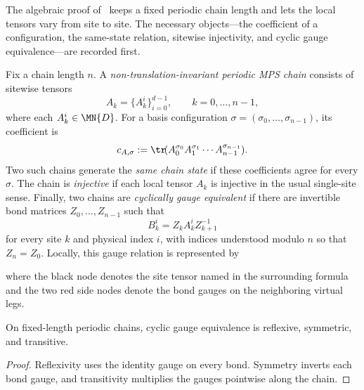 The algebraic proof of~\cite{Molnar2018NormalPEPS} keeps a fixed periodic
chain length and lets the local tensors vary from site to site. The
necessary objects---the coefficient of a configuration, the same-state
relation, sitewise injectivity, and cyclic gauge equivalence---are recorded
first.

\begin{definition}\label{def:non_ti_chain}
    \leanok
    Fix a chain length $n$.
    A \emph{non-translation-invariant periodic MPS chain} consists of sitewise
    tensors
    \[
        A_k = \{A_k^i\}_{i=0}^{d-1}, \qquad k = 0, \dots, n-1,
    \]
    where each $A_k^i \in \MN{D}$.
    For a basis configuration $\sigma = (\sigma_0,\dots,\sigma_{n-1})$, its
    coefficient is
    \[
        c_{A,\sigma}
        := \tr\!(A_0^{\sigma_0} A_1^{\sigma_1} \cdots A_{n-1}^{\sigma_{n-1}}).
    \]
    Two such chains generate the \emph{same chain state} if these coefficients
    agree for every $\sigma$.
    The chain is \emph{injective} if each local tensor $A_k$ is injective in
    the usual single-site sense.
    Finally, two chains are \emph{cyclically gauge equivalent} if there are
    invertible bond matrices $Z_0,\dots,Z_{n-1}$ such that
    \[
        B_k^i = Z_k A_k^i Z_{k+1}^{-1}
    \]
    for every site $k$ and physical index $i$, with indices understood modulo
    $n$ so that $Z_n = Z_0$. Locally, this gauge relation is
    represented by
    \begin{center}
    \end{center}
    where the black node denotes the site tensor named in the surrounding
    formula and the two red side nodes denote the bond gauges on the
    neighboring virtual legs.
\end{definition}

\begin{lemma}
    \label{lem:chain_gauge_equiv_equivalence}
    \leanok
    On fixed-length periodic chains, cyclic gauge equivalence is reflexive,
    symmetric, and transitive.
\end{lemma}

\begin{proof}
    \leanok
    Reflexivity uses the identity gauge on every bond.
    Symmetry inverts each bond gauge, and transitivity multiplies the gauges
    pointwise along the chain.
\end{proof}

